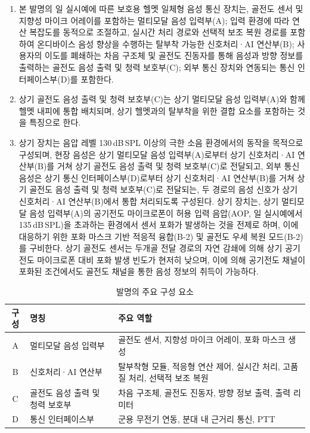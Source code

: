 \documentclass{article}
\begin{document}
\begin{enumerate}[label = \textbf{(S.\arabic*)}]

    \item 본 발명의 일 실시예에 따른 보호용 헬멧 일체형 음성 통신 장치는,
    골전도 센서 및 지향성 마이크 어레이를 포함하는 멀티모달 음성 입력부(A);
    입력 환경에 따라 연산 복잡도를 동적으로 조절하고, 실시간 처리 경로와 선택적 보조 복원 경로를 포함하여 온디바이스 음성 향상을 수행하는 탈부착 가능한 신호처리·AI 연산부(B);
    사용자의 이도를 폐쇄하는 차음 구조체 및 골전도 진동자를 통해 음성과 방향 정보를 출력하는 골전도 음성 출력 및 청력 보호부(C);
    외부 통신 장치와 연동되는 통신 인터페이스부(D)를 포함한다.

    \item 상기 골전도 음성 출력 및 청력 보호부(C)는 상기 멀티모달
    음성 입력부(A)와 함께 헬멧 내피에 통합 배치되며, 상기 헬멧과의
    탈부착을 위한 결합 요소를 포함하는 것을 특징으로 한다.

    \item 상기 장치는 음압 레벨 130\,dB\,SPL 이상의 극한 소음 환경에서의 동작을 목적으로 구성되며, 현장 음성은 상기 멀티모달 음성 입력부(A)로부터 상기 신호처리·AI 연산부(B)를 거쳐 상기 골전도 음성 출력 및 청력 보호부(C)로 전달되고, 외부 통신 음성은 상기 통신 인터페이스부(D)로부터 상기 신호처리·AI 연산부(B)를 거쳐 상기 골전도 음성 출력 및 청력 보호부(C)로 전달되는, 두 경로의 음성 신호가 상기 신호처리·AI 연산부(B)에서 통합 처리되도록 구성된다. 상기 장치는, 상기 멀티모달 음성 입력부(A)의 공기전도 마이크로폰이 허용 입력 음압(AOP, 일 실시예에서 135\,dB\,SPL)을 초과하는 환경에서 센서 포화가 발생하는 것을 전제로 하며, 이에 대응하기 위한 포화 마스크 기반 적응적 융합(B-2) 및 골전도 우세 복원 모드(B-2)를 구비한다. 상기 골전도 센서는 두개골 전달 경로의 자연 감쇄에 의해 상기 공기전도 마이크로폰 대비 포화 발생 빈도가 현저히 낮으며, 이에 의해 공기전도 채널이 포화된 조건에서도 골전도 채널을 통한 음성 정보의 취득이 가능하다.
\end{enumerate}


\begin{table}[!h]
    \centering
    \begin{tabular}{c|l|l}
        \hline
        구성 & 명칭 & 주요 역할 \\
        \hline\hline
        A & 멀티모달 음성 입력부
          & 골전도 센서, 지향성 마이크 어레이, 포화 마스크 생성 \\
        B & 신호처리·AI 연산부
          & 탈부착형 모듈, 적응형 연산 제어, 실시간 처리, 고품질 처리, 선택적 보조 복원 \\
        C & 골전도 음성 출력 및 청력 보호부
          & 차음 구조체, 골전도 진동자, 방향 정보 출력, 출력 리미터 \\
        D & 통신 인터페이스부
          & 군용 무전기 연동, 분대 내 근거리 통신, PTT \\
        \hline
    \end{tabular}
    \caption{발명의 주요 구성 요소}
    \label{tab:components}
\end{table}
\end{document}
